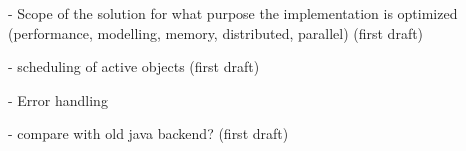 

- Scope of the solution
for what purpose the implementation is optimized
(performance, modelling, memory, distributed, parallel)
(first draft)


- scheduling of active objects
(first draft)

- Error handling

- compare with old java backend?
(first draft)